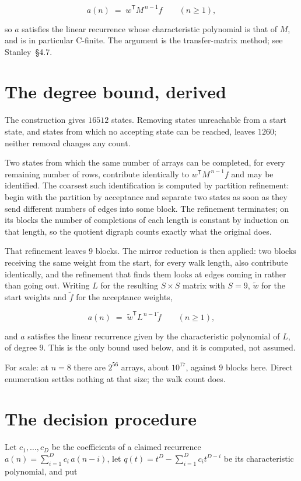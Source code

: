 \documentclass[11pt]{article}
\theoremstyle{definition}
\begin{document}
\[a(n) \;=\; w^{\mathsf T} M^{\,n-1} f \qquad (n \ge 1),\]

so $a$ satisfies the linear recurrence whose characteristic polynomial is that of $M$, and is in particular C-finite. The argument is the transfer-matrix method; see Stanley~\S4.7.

\section{The degree bound, derived}

The construction gives $16512$ states. Removing states unreachable from a start state, and states from which no accepting state can be reached, leaves $1260$; neither removal changes any count.

Two states from which the same number of arrays can be completed, for every remaining number of rows, contribute identically to $w^{\mathsf T}M^{\,n-1}f$ and may be identified. The coarsest such identification is computed by partition refinement: begin with the partition by acceptance and separate two states as soon as they send different numbers of edges into some block. The refinement terminates; on its blocks the number of completions of each length is constant by induction on that length, so the quotient digraph counts exactly what the original does.

That refinement leaves $9$ blocks. The mirror reduction is then applied: two blocks receiving the same weight from the start, for every walk length, also contribute identically, and the refinement that finds them looks at edges coming in rather than going out. Writing $L$ for the resulting $S \times S$ matrix with $S = 9$, $\tilde w$ for the start weights and $\tilde f$ for the acceptance weights,

\[a(n) \;=\; \tilde w^{\mathsf T} L^{\,n-1} \tilde f \qquad (n \ge 1),\]

and $a$ satisfies the linear recurrence given by the characteristic polynomial of $L$, of degree $9$. This is the only bound used below, and it is computed, not assumed.

For scale: at $n = 8$ there are $2^{56}$ arrays, about $10^{17}$, against $9$ blocks here. Direct enumeration settles nothing at that size; the walk count does.

\section{The decision procedure}

Let $c_1,\dots,c_D$ be the coefficients of a claimed recurrence $a(n) = \sum_{i=1}^{D} c_i\,a(n-i)$, let $q(t) = t^{D} - \sum_{i=1}^{D} c_i t^{D-i}$ be its characteristic polynomial, and put
\end{document}
